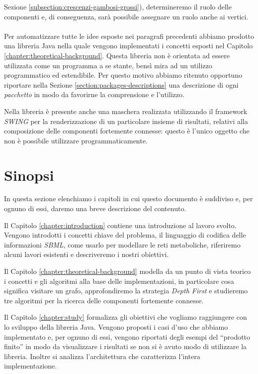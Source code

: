 Sezione \ref{subsection:crescenzi-gambosi-grossi}), determineremo il
ruolo delle componenti e, di conseguenza, sar\`a possibile assegnare
un ruolo anche ai vertici.
\\\\
Per automatizzare tutte le idee esposte nei paragrafi precedenti
abbiamo prodotto una libreria Java nella quale vengono implementati i
concetti esposti nel Capitolo
\ref{chapter:theoretical-background}. Questa libreria non \`e
orientata ad essere utilizzata come un programma a se stante, bens\`i
mira ad un utilizzo programmatico ed estendibile. Per questo motivo
abbiamo ritenuto opportuno riportare nella Sezione
\ref{section:packages-descriptions} una descrizione di ogni
\emph{pacchetto} in modo da favorirne la comprensione e l'utilizzo.

Nella libreria \`e presente anche una maschera realizzata utilizzando
il framework \emph{SWING} per la renderizzazione di un particolare
insieme di risultati, relativi alla composizione delle componenti
fortemente connesse: questo \`e l'unico oggetto che non \`e possibile
utilizzare programmaticamente.

\section{Sinopsi}
In questa sezione elenchiamo i capitoli in cui questo documento \`e
suddiviso e, per ognuno di essi, daremo una breve descrizione del
contenuto.

Il Capitolo \ref{chapter:introduction} contiene una introduzione al
lavoro svolto. Vengono introdotti i concetti chiave del problema, il
linguaggio di codifica delle informazioni \emph{SBML}, come usarlo per
modellare le reti metaboliche, riferiremo alcuni lavori esistenti e
descriveremo i nostri obiettivi.

Il Capitolo \ref{chapter:theoretical-background} modella da un punto
di vista teorico i concetti e gli algoritmi alla base delle
implementazioni, in particolare cosa significa visitare un grafo,
approfondiremo la strategia \emph{Depth First} e studieremo tre
algoritmi per la ricerca delle componenti fortemente connesse.

Il Capitolo \ref{chapter:study} formalizza gli obiettivi che vogliamo
raggiungere con lo sviluppo della libreria Java. Vengono proposti i
casi d'uso che abbiamo implementato e, per ognuno di essi, vengono
riportati degli esempi del ``prodotto finito'' in modo da visualizzare
i risultati se non si \`e avuto modo di utilizzare la
libreria. Inoltre si analizza l'architettura che caratterizza l'intera
implementazione.

